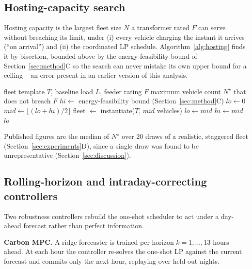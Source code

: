 \documentclass[journal]{IEEEtran}
\begin{document}
\subsection{Hosting-capacity search}
Hosting capacity is the largest fleet size $N$ a transformer rated $F$ can serve without breaching its limit, under (i) every vehicle charging the instant it arrives (``on arrival'') and (ii) the coordinated LP schedule. Algorithm~\ref{alg:hosting} finds it by bisection, bounded above by the energy-feasibility bound of Section~\ref{sec:method}C so the search can never mistake its own upper bound for a ceiling -- an error present in an earlier version of this analysis.
\begin{algorithm}[t]
\caption{Hosting-capacity bisection search}
\label{alg:hosting}
\begin{algorithmic}[1]
\Require fleet template $T$, baseline load $L$, feeder rating $F$
\Ensure maximum vehicle count $N^\star$ that does not breach $F$
\State $\mathit{hi} \gets$ energy-feasibility bound (Section~\ref{sec:method}C)
\State $\mathit{lo} \gets 0$
  \State $\mathit{mid} \gets \lfloor (\mathit{lo}+\mathit{hi})/2 \rfloor$
  \State fleet $\gets$ instantiate($T$, $\mathit{mid}$ vehicles)
    \State $\mathit{lo} \gets \mathit{mid}$
  \Else
    \State $\mathit{hi} \gets \mathit{mid}$
  \EndIf
\EndWhile
\State \Return $\mathit{lo}$
\end{algorithmic}
\end{algorithm}
Published figures are the median of $N^\star$ over 20 draws of a realistic, staggered fleet (Section~\ref{sec:experiments}D), since a single draw was found to be unrepresentative (Section~\ref{sec:discussion}).

\subsection{Rolling-horizon and intraday-correcting controllers}
Two robustness controllers rebuild the one-shot scheduler to act under a day-ahead forecast rather than perfect information.

\textbf{Carbon MPC.} A ridge forecaster is trained per horizon $k=1,\dots,13$ hours ahead. At each hour the controller re-solves the one-shot LP against the current forecast and commits only the next hour, replaying over held-out nights.
\end{document}
